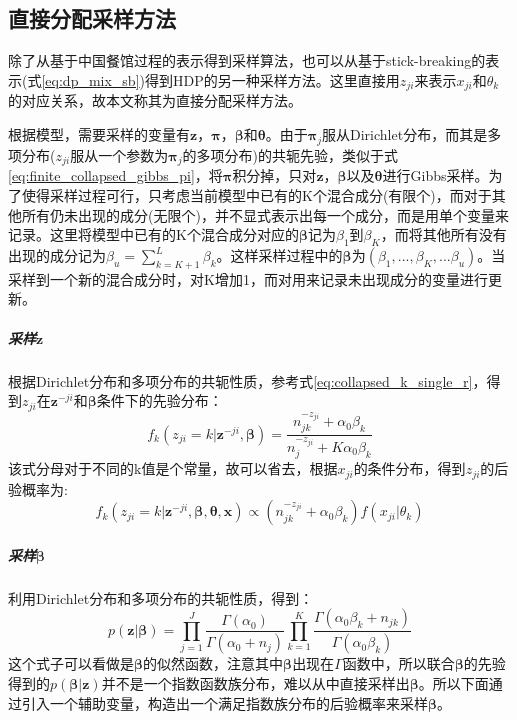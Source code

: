 \subsection{直接分配采样方法}\label{subsec:direct_assignment_sample}
除了从基于中国餐馆过程的表示得到采样算法，也可以从基于stick-breaking的表示(式\eqref{eq:dp_mix_sb})得到HDP的另一种采样方法。这里直接用$z_{ji}$来表示$x_{ji}$和$\theta_k$的对应关系，故本文称其为直接分配采样方法\cite{TEH:06,heinrich:2011,zhou2011}。

根据模型，需要采样的变量有${\bm z}$，${\bm \pi}$，${\bm \beta}$和${\bm \theta}$。由于${\bm \pi_j}$服从Dirichlet分布，而其是多项分布($z_{ji}$服从一个参数为${\bm \pi_j}$的多项分布)的共轭先验，类似于式\eqref{eq:finite_collapsed_gibbs_pi}，将${\bm \pi}$积分掉，只对${\bm z}$，${\bm \beta}$以及${\bm \theta}$进行Gibbs采样。为了使得采样过程可行，只考虑当前模型中已有的K个混合成分(有限个)，而对于其他所有仍未出现的成分(无限个)，并不显式表示出每一个成分，而是用单个变量来记录。这里将模型中已有的K个混合成分对应的${\bm \beta}$记为$\beta_1$到$\beta_K$，而将其他所有没有出现的成分记为$\beta_u = \sum_{k=K+1}^{L}\beta_k$。这样采样过程中的${\bm \beta}$为$(\beta_1,...,\beta_K,...\beta_u)$。当采样到一个新的混合成分时，对K增加1，而对用来记录未出现成分的变量进行更新。

\subparagraph{采样${\bm z}$}
根据Dirichlet分布和多项分布的共轭性质，参考式\eqref{eq:collapsed_k_single_r}，得到${z_{ji}}$在${\bm z}^{-ji}$和${\bm \beta}$条件下的先验分布：
\begin{equation}
f_k(z_{ji}=k|{\bm z}^{-ji},{\bm \beta}) = \frac{n_{jk}^{-z_{ji}} + \alpha_0\beta_k}{n_j^{-z_{ji}} + K\alpha_0\beta_k} \label{eq:piror_z} 
\end{equation}
该式分母对于不同的k值是个常量，故可以省去，根据$x_{ji}$的条件分布，得到$z_{ji}$的后验概率为:
\begin{equation}
f_k(z_{ji}=k|{\bm z}^{-ji},{\bm \beta},{\bm \theta},{\bm x}) \propto (n_{jk}^{-z_{ji}} + \alpha_0\beta_k)f(x_{ji}|\theta_k)\label{eq:sample_z} 
\end{equation}

\subparagraph{采样${\bm \beta}$}
利用Dirichlet分布和多项分布的共轭性质，得到：
\begin{equation}
p({\bm z}|{\bm \beta}) = \prod_{j=1}^{J}\frac{\Gamma(\alpha_0)}{\Gamma(\alpha_0 + n_j)} \prod_{k=1}^{K}\frac{\Gamma(\alpha_0\beta_k+n_{jk})}{\Gamma(\alpha_0\beta_k)} \label{eq:z_cond_beta}
\end{equation}
这个式子可以看做是${\bm \beta}$的似然函数，注意其中${\bm \beta}$出现在$\Gamma$函数中，所以联合${\bm \beta}$的先验得到的$p({\bm \beta}|{\bm z})$并不是一个指数函数族分布，难以从中直接采样出${\bm \beta}$。所以下面通过引入一个辅助变量，构造出一个满足指数族分布的后验概率来采样${\bm \beta}$。

